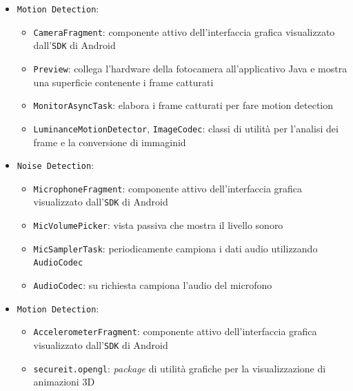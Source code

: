 \begin{itemize}
	\item \texttt{Motion Detection}:
		\begin{itemize}
			\item \texttt{CameraFragment}: componente attivo dell'interfaccia grafica visualizzato dall'\texttt{SDK} di Android
			\item \texttt{Preview}: collega l'hardware della fotocamera all'applicativo Java e mostra una superficie contenente i frame catturati
			\item \texttt{MonitorAsyncTask}: elabora i frame catturati per fare motion detection
			\item \texttt{LuminanceMotionDetector}, \texttt{ImageCodec}: classi di utilità per l'analisi dei frame e la conversione di immaginid 
		\end{itemize}
	\item \texttt{Noise Detection}:
		\begin{itemize}
			\item \texttt{MicrophoneFragment}: componente attivo dell'interfaccia grafica visualizzato dall'\texttt{SDK} di Android
			\item \texttt{MicVolumePicker}: vista passiva che mostra il livello sonoro
			\item \texttt{MicSamplerTask}: periodicamente campiona i dati audio utilizzando \texttt{AudioCodec}
			\item \texttt{AudioCodec}: su richiesta campiona l'audio del microfono
		\end{itemize}
	\item \texttt{Motion Detection}:
		\begin{itemize}
			\item \texttt{AccelerometerFragment}: componente attivo dell'interfaccia grafica visualizzato dall'\texttt{SDK} di Android
			\item \texttt{secureit.opengl}: \textit{package} di utilità grafiche per la visualizzazione di animazioni 3D
		\end{itemize}
\end{itemize}

